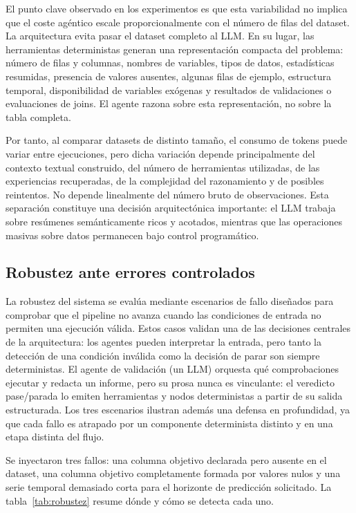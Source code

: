 \documentclass[12pt,a4paper]{article}
\theoremstyle{plain}
\begin{document}
El punto clave observado en los experimentos es que esta variabilidad no implica que el coste
agéntico escale proporcionalmente con el número de filas del dataset. La arquitectura evita
pasar el dataset completo al LLM. En su lugar, las herramientas deterministas generan una
representación compacta del problema: número de filas y columnas, nombres de variables, tipos
de datos, estadísticas resumidas, presencia de valores ausentes, algunas filas de ejemplo,
estructura temporal, disponibilidad de variables exógenas y resultados de validaciones o
evaluaciones de joins. El agente razona sobre esta representación, no sobre la tabla completa.

Por tanto, al comparar datasets de distinto tamaño, el consumo de tokens puede variar entre
ejecuciones, pero dicha variación depende principalmente del contexto textual construido, del
número de herramientas utilizadas, de las experiencias recuperadas, de la complejidad del
razonamiento y de posibles reintentos. No depende linealmente del número bruto de
observaciones. Esta separación constituye una decisión arquitectónica importante: el LLM
trabaja sobre resúmenes semánticamente ricos y acotados, mientras que las operaciones masivas
sobre datos permanecen bajo control programático.

\subsection{Robustez ante errores controlados}
\label{sec:robustez-controlador}

La robustez del sistema se evalúa mediante escenarios de fallo diseñados para comprobar que el pipeline no avanza cuando las condiciones de entrada no permiten una ejecución válida. Estos casos validan una de las decisiones centrales de la arquitectura: los agentes pueden interpretar la entrada, pero tanto la detección de una condición inválida como la decisión de parar son siempre deterministas. El agente de validación (un LLM) orquesta qué comprobaciones
ejecutar y redacta un informe, pero su prosa nunca es vinculante: el veredicto pase/parada lo emiten herramientas y nodos deterministas a partir de su salida estructurada. Los tres escenarios ilustran además una defensa en profundidad, ya que cada fallo es atrapado por un componente determinista distinto y en una etapa distinta del flujo.

Se inyectaron tres fallos: una columna objetivo declarada pero ausente en el dataset, una columna objetivo completamente formada por valores nulos y una serie temporal demasiado corta para el horizonte de predicción solicitado. La tabla~\ref{tab:robustez} resume dónde y cómo se detecta cada uno.
\end{document}
